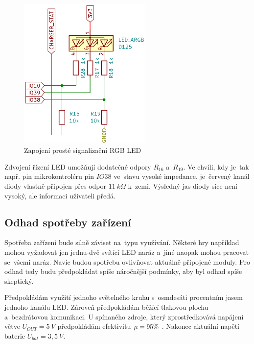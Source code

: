 \vspace{-3mm}
\begin{figure}[h!]
    \centering
    \includegraphics[angle=-90,width=0.585\textwidth]{text/PraktickaCast/img/RGB-LED.png}
    \caption{Zapojení prosté signalizační RGB LED}
    \label{fig:hloupa-LED}
\end{figure}
\vspace{-2mm}

Zdvojení řízení LED umožňují dodatečné odpory \(R_{16}\) a~\(R_{19}\).
Ve chvíli, kdy je~tak např. pin mikrokontroléru pin \(IO38\) ve~stavu vysoké impedance, je~červený kanál diody vlastně připojen přes odpor \(11~k\Omega\) k~zemi.
Výsledný jas diody sice není vysoký, ale informaci uživateli předá.

\subsection{Odhad spotřeby zařízení}
Spotřeba zařízení bude silně záviset na~typu využívání.
Některé hry například mohou vyžadovat jen jednu-dvě svítící LED naráz a~jiné naopak mohou pracovat se~všemi naráz.
Navíc budou spotřebu ovlivňovat aktuálně připojené moduly.
Pro odhad tedy budu předpokládat spíše náročnější podmínky, aby byl odhad spíše skeptický.

Předpokládám využití jednoho světelného kruhu s~osmdesáti procentním jasem jednoho kanálu LED.
Zároveň předpokládám běžící tlakovou plochu a~bezdrátovou komunikaci.
U spínaného zdroje, který zprostředkovává napájení větve \(U_{OUT} = 5~V\) předpokládám efektivitu \(\mu = 95\-\%\) \cite{TPS61088}.
Nakonec aktuální napětí baterie \(U_{bat} = 3,5~V\). 

